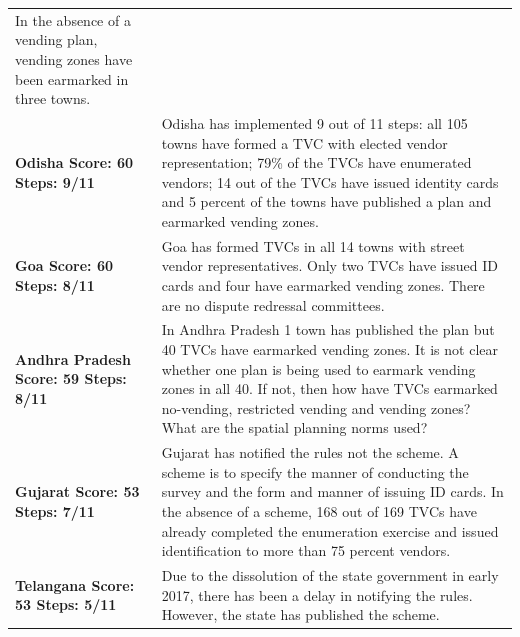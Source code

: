 \documentclass[a4paper, 12pt, twoside]{article}
\begin{document}
{\begin{longtable}[l]{>{\raggedright}p{4cm}>{\raggedright\arraybackslash}p{10cm}}
In the absence of a vending plan, vending zones have been earmarked in three towns.
\\
\cellcolor{SVACgreen3}\bf{Odisha}
\newline
\bf{Score: 60}
\newline
\bf{Steps: 9/11}
&
\cellcolor{SVACgreen2}Odisha has implemented 9 out of 11 steps: all 105 towns have formed a TVC with elected vendor representation; 79\% of the TVCs have enumerated vendors; 14 out of the TVCs have issued identity cards and 5 percent of the towns have published a plan and earmarked vending zones.
\\
\cellcolor{SVACgreen3}\bf{Goa}
\newline
\bf{Score: 60}
\newline
\bf{Steps: 8/11}
&
\cellcolor{SVACgreen2}Goa has formed TVCs in all 14 towns with street vendor representatives. Only two TVCs have issued ID cards and four have earmarked vending zones. There are no dispute redressal committees.
\\
\cellcolor{SVACgreen3}\bf{Andhra Pradesh}
\newline
\bf{Score: 59}
\newline
\bf{Steps: 8/11}
&
\cellcolor{SVACgreen2}In Andhra Pradesh 1 town has published the plan but 40 TVCs have earmarked vending zones. It is not clear whether one plan is being used to earmark vending zones in all 40. If not, then how have TVCs earmarked no-vending, restricted vending and vending zones? What are the spatial planning norms used?
\\
\cellcolor{SVACgreen3}\bf{Gujarat}
\newline
\bf{Score: 53}
\newline
\bf{Steps: 7/11}
&
\cellcolor{SVACgreen2}Gujarat has notified the rules not the scheme. A scheme is to specify the manner of conducting the survey and the form and manner of issuing ID cards. In the absence of a scheme, 168 out of 169 TVCs have already completed the enumeration exercise and issued identification to more than 75 percent vendors.
\\
\cellcolor{SVACgreen3}\bf{Telangana}
\newline
\bf{Score: 53}
\newline
\bf{Steps: 5/11}
&
\cellcolor{SVACgreen2}Due to the dissolution of the state government in early 2017, there has been a delay in notifying the rules. However, the state has published the scheme.


\end{longtable}}
\end{document}
